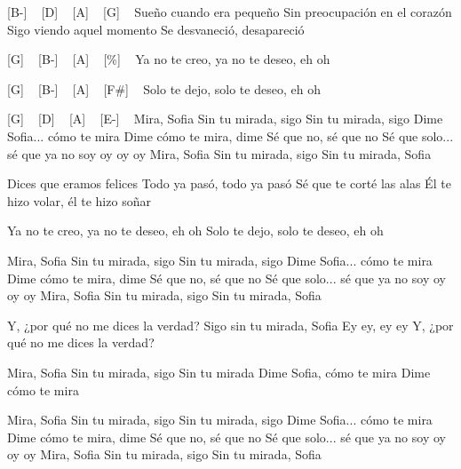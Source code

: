 

[B-] ~ [D] ~ [A] ~ [G] ~
Sueño cuando era pequeño
Sin preocupación en el corazón
Sigo viendo aquel momento
Se desvaneció, desapareció

[G] ~ [B-] ~ [A] ~ [\%] ~
Ya no te creo, ya no te deseo, eh oh

[G] ~ [B-] ~ [A] ~ [F#] ~
Solo te dejo, solo te deseo, eh oh

[G] ~ [D] ~ [A] ~ [E-] ~
Mira, Sofia
Sin tu mirada, sigo
Sin tu mirada, sigo
Dime Sofia... cómo te mira
Dime cómo te mira, dime
Sé que no, sé que no
Sé que solo... sé que ya no soy oy oy oy
Mira, Sofia
Sin tu mirada, sigo
Sin tu mirada, Sofia
 
Dices que eramos felices
Todo ya pasó, todo ya pasó
Sé que te corté las alas
Él te hizo volar, él te hizo soñar
 
Ya no te creo, ya no te deseo, eh oh
Solo te dejo, solo te deseo, eh oh
 
Mira, Sofia
Sin tu mirada, sigo
Sin tu mirada, sigo
Dime Sofia... cómo te mira
Dime cómo te mira, dime
Sé que no, sé que no
Sé que solo... sé que ya no soy oy oy oy
Mira, Sofia
Sin tu mirada, sigo
Sin tu mirada, Sofia
 
Y, ¿por qué no me dices la verdad?
Sigo sin tu mirada, Sofia
Ey ey, ey ey
Y, ¿por qué no me dices la verdad?
 
Mira, Sofia
Sin tu mirada, sigo
Sin tu mirada
Dime Sofia, cómo te mira
Dime cómo te mira
 
Mira, Sofia
Sin tu mirada, sigo
Sin tu mirada, sigo
Dime Sofia... cómo te mira
Dime cómo te mira, dime
Sé que no, sé que no
Sé que solo... sé que ya no soy oy oy oy
Mira, Sofia
Sin tu mirada, sigo
Sin tu mirada, Sofia